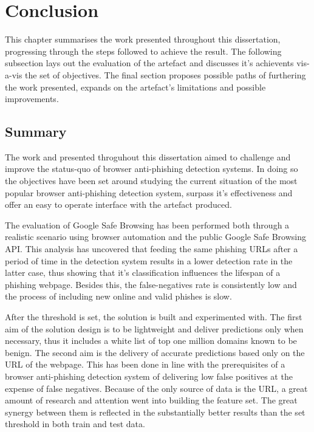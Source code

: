 \chapter{Conclusion}
This chapter summarises the work presented throughout this dissertation, progressing through the steps followed to achieve the result. The following subsection lays out the evaluation of the artefact and discusses it's achievents vis-a-vis the set of objectives. The final section proposes possible paths of furthering the work presented, expands on the artefact's limitations and possible improvements.

\section{Summary}
The work and presented throguhout this dissertation aimed to challenge and improve the status-quo of browser anti-phishing detection systems. In doing so the objectives have been set around studying the current situation of the most popular browser anti-phishing detection system, surpass it's effectiveness and offer an easy to operate interface with the artefact produced.

The evaluation of Google Safe Browsing has been performed both through a realistic scenario using browser automation and the public Google Safe Browsing API. This analysis has uncovered that feeding the same phishing URLs after a period of time in the detection system results in a lower detection rate in the latter case, thus showing that it's classification influences the lifespan of a phishing webpage. Besides this, the false-negatives rate is consistently low and the process of including new online and valid phishes is slow.

After the threshold is set, the solution is built and experimented with. The first aim of the solution design is to be lightweight and deliver predictions only when necessary, thus it includes a white list of top one million domains known to be benign. The second aim is the delivery of accurate predictions based only on the URL of the webpage. This has been done in line with the prerequisites of a browser anti-phishing detection system of delivering low false positives at the expense of false negatives.
Because of the only source of data is the URL, a great amount of research and attention went into building the feature set. The great synergy between them is reflected in the substantially better results than the set threshold in both train and test data.

